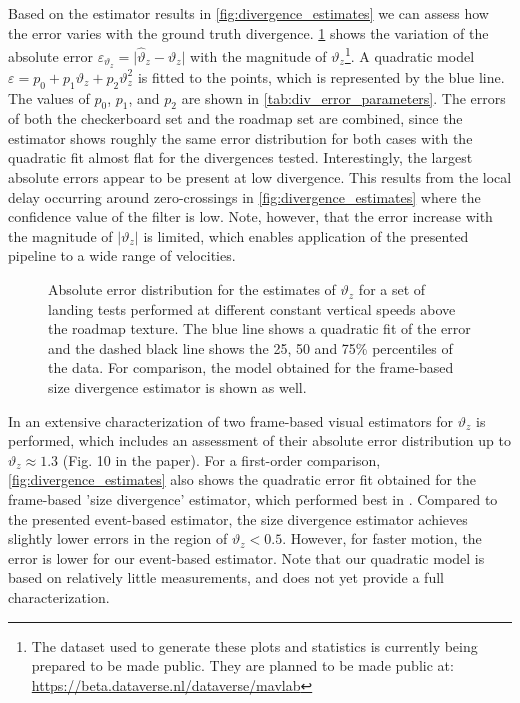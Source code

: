 Based on the estimator results in \cref{fig:divergence_estimates} we can assess how the error varies with the ground truth divergence. \cref{fig:divergence_error_dist} shows the variation of the absolute error $\varepsilon_{\vartheta_z}=\lvert\hat{\vartheta}_z-\vartheta_z \rvert$ with the magnitude of $\vartheta_z$\footnote{The dataset used to generate these plots and statistics is currently being prepared to be made public. They are planned to be made public at: \url{https://beta.dataverse.nl/dataverse/mavlab}}. A quadratic model $\varepsilon = p_0 + p_1 \vartheta_z + p_2 \vartheta_z^2$ is fitted to the points, which is represented by the blue line. The values of $p_0$, $p_1$, and $p_2$ are shown in \cref{tab:div_error_parameters}. The errors of both the checkerboard set and the roadmap set are combined, since the estimator shows roughly the same error distribution for both cases with the quadratic fit almost flat for the divergences tested. Interestingly, the largest absolute errors appear to be present at low divergence. This results from the local delay occurring around zero-crossings in \cref{fig:divergence_estimates} where the confidence value of the filter is low. Note, however, that the error increase with the magnitude of $\lvert\vartheta_z\rvert$ is limited, which enables application of the presented pipeline to a wide range of velocities.

\begin{figure}[!ht]
	\centering
	\setlength{\fwidth}{0.6\linewidth}
	\renewcommand{\xlabeldist}{0.0}
	\renewcommand{\ylabeldist}{0.0}
	
	\caption{Absolute error distribution for the estimates of $\vartheta_z$ for a set of landing tests performed at different constant vertical speeds above the roadmap texture. The blue line shows a quadratic fit of the error and the dashed black line shows the 25, 50 and 75\% percentiles of the data. For comparison, the model obtained for the frame-based size divergence estimator \cite{Ho2016a} is shown as well.} 
	\label{fig:divergence_error_dist}
\end{figure}


In \citet{Ho2016a} an extensive characterization of two frame-based visual estimators for $\vartheta_z$ is performed, which includes an assessment of their absolute error distribution up to $\vartheta_z\approx 1.3$ (Fig. 10 in the paper). For a first-order comparison, \cref{fig:divergence_estimates} also shows the quadratic error fit obtained for the frame-based 'size divergence' estimator, which performed best in \citet{Ho2016a}. Compared to the presented event-based estimator, the size divergence estimator achieves slightly lower errors in the region of $\vartheta_z < 0.5$. However, for faster motion, the error is lower for our event-based estimator. Note that our quadratic model is based on relatively little measurements, and does not yet provide a full characterization.

